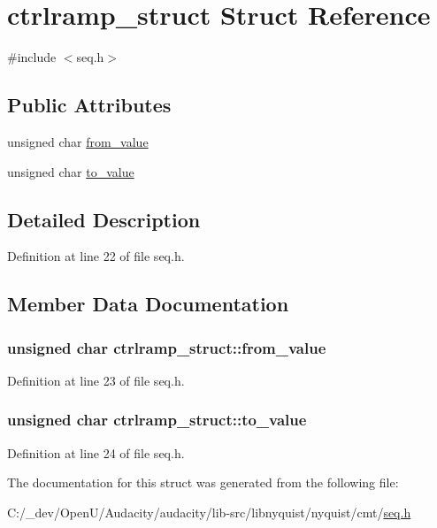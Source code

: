 \hypertarget{structctrlramp__struct}{}\section{ctrlramp\+\_\+struct Struct Reference}
\label{structctrlramp__struct}


{\ttfamily \#include $<$seq.\+h$>$}

\subsection*{Public Attributes}
\begin{DoxyCompactItemize}
\item 
unsigned char \hyperlink{structctrlramp__struct_a785ae4b0f77ec59fcb588c304b411d89}{from\+\_\+value}
\item 
unsigned char \hyperlink{structctrlramp__struct_ae836addd0ff4f4c68ed9f1832ea00a39}{to\+\_\+value}
\end{DoxyCompactItemize}


\subsection{Detailed Description}


Definition at line 22 of file seq.\+h.



\subsection{Member Data Documentation}
\subsubsection[{\texorpdfstring{from\+\_\+value}{from_value}}]{\setlength{\rightskip}{0pt plus 5cm}unsigned char ctrlramp\+\_\+struct\+::from\+\_\+value}\hypertarget{structctrlramp__struct_a785ae4b0f77ec59fcb588c304b411d89}{}\label{structctrlramp__struct_a785ae4b0f77ec59fcb588c304b411d89}


Definition at line 23 of file seq.\+h.

\subsubsection[{\texorpdfstring{to\+\_\+value}{to_value}}]{\setlength{\rightskip}{0pt plus 5cm}unsigned char ctrlramp\+\_\+struct\+::to\+\_\+value}\hypertarget{structctrlramp__struct_ae836addd0ff4f4c68ed9f1832ea00a39}{}\label{structctrlramp__struct_ae836addd0ff4f4c68ed9f1832ea00a39}


Definition at line 24 of file seq.\+h.



The documentation for this struct was generated from the following file\+:\begin{DoxyCompactItemize}
\item 
C\+:/\+\_\+dev/\+Open\+U/\+Audacity/audacity/lib-\/src/libnyquist/nyquist/cmt/\hyperlink{seq_8h}{seq.\+h}\end{DoxyCompactItemize}

